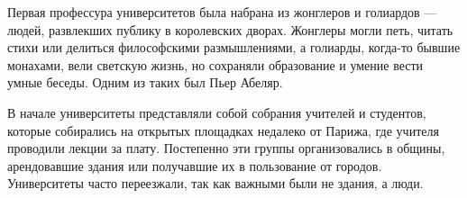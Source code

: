 
Первая профессура университетов была набрана из жонглеров и голиардов --- людей, развлекших публику в королевских дворах. Жонглеры могли петь, читать стихи или делиться философскими размышлениями, а голиарды, когда-то бывшие монахами, вели светскую жизнь, но сохраняли образование и умение вести умные беседы. Одним из таких был Пьер Абеляр.



В начале университеты представляли собой собрания учителей и студентов, которые собирались на открытых площадках недалеко от Парижа, где учителя проводили лекции за плату. Постепенно эти группы организовались в общины, арендовавшие здания или получавшие их в пользование от городов. Университеты часто переезжали, так как важными были не здания, а люди.

